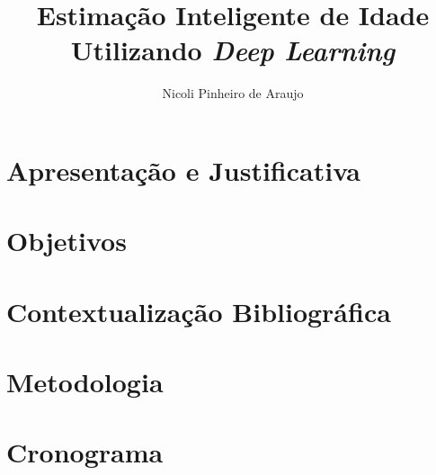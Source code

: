 \documentclass[12pt]{article}
\title{Estimação Inteligente de Idade Utilizando \emph{Deep Learning}}
\author{Nicoli Pinheiro de Araujo}
\begin{document}

\maketitle

\section{Apresentação e Justificativa}\label{sec:intro}



\section{Objetivos}\label{sec:objetivo}


\section{Contextualização Bibliográfica}\label{sec:fund_teorica}


\section{Metodologia}\label{sec:metodo}


\section{Cronograma}\label{sec:crono}



\end{document}
